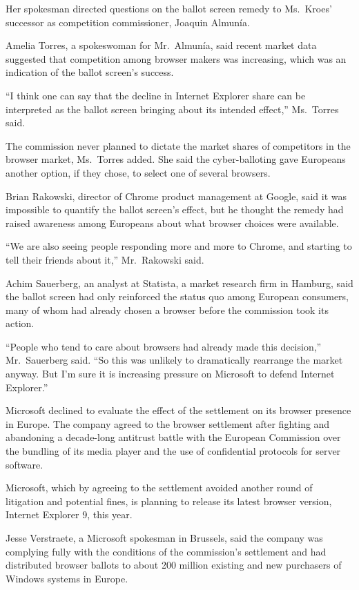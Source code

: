 ﻿\documentclass[12pt]{article}
\begin{document}
Her spokesman directed questions on the ballot screen remedy to Ms.~Kroes' successor as competition
commissioner, Joaquin Almunía.

Amelia Torres, a spokeswoman for Mr.~Almunía, said recent market data suggested that competition
among browser makers was increasing, which was an indication of the ballot screen's success.

``I think one can say that the decline in Internet Explorer share can be interpreted as the ballot
screen bringing about its intended effect,'' Ms.~Torres said.

The commission never planned to dictate the market shares of competitors in the browser market,
Ms.~Torres added. She said the cyber-balloting gave Europeans another option, if they chose, to
select one of several browsers.

Brian Rakowski, director of Chrome product management at Google, said it was impossible to quantify
the ballot screen's effect, but he thought the remedy had raised awareness among Europeans about
what browser choices were available.

``We are also seeing people responding more and more to Chrome, and starting to tell their friends
about it,'' Mr.~Rakowski said.

Achim Sauerberg, an analyst at Statista, a market research firm in Hamburg, said the ballot screen
had only reinforced the status quo among European consumers, many of whom had already chosen a
browser before the commission took its action.

``People who tend to care about browsers had already made this decision,'' Mr.~Sauerberg said. ``So
this was unlikely to dramatically rearrange the market anyway. But I'm sure it is increasing
pressure on Microsoft to defend Internet Explorer.''

Microsoft declined to evaluate the effect of the settlement on its browser presence in Europe. The
company agreed to the browser settlement after fighting and abandoning a decade-long antitrust
battle with the European Commission over the bundling of its media player and the use of
confidential protocols for server software.

Microsoft, which by agreeing to the settlement avoided another round of litigation and potential
fines, is planning to release its latest browser version, Internet Explorer 9, this year.

Jesse Verstraete, a Microsoft spokesman in Brussels, said the company was complying fully with the
conditions of the commission's settlement and had distributed browser ballots to about 200 million
existing and new purchasers of Windows systems in Europe.
\end{document}
